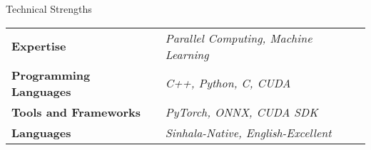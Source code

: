 \documentclass[
	11pt, %
]{./assets/resume} %
\begin{document}
	




\begin{rSection}{Technical Strengths}

	\def\arraystretch{1.5}

	\begin{tabular}{ l l}
		\textbf{Expertise} & \emph{Parallel Computing, Machine Learning} \\
		\textbf{Programming Languages} & \emph{C++, Python, C, CUDA} \\
		\textbf{Tools and Frameworks} & \emph{PyTorch, ONNX, CUDA SDK} \\ 
		\textbf{Languages} & \emph{Sinhala-Native, English-Excellent} \\
	\end{tabular}

\end{rSection}

\end{document}
